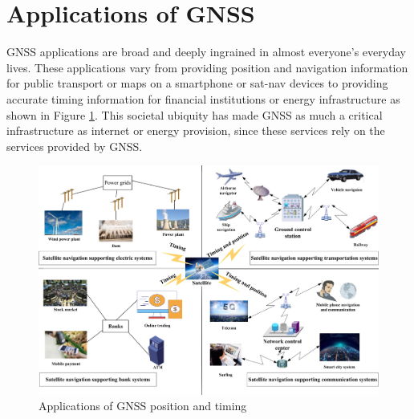 
\section{Applications of GNSS} \label{sec:ApplicationsGNSS}
GNSS applications are broad and deeply ingrained in almost everyone's everyday lives. These applications vary from providing position and navigation information for public
transport or maps on a smartphone or sat-nav devices to providing accurate timing information for financial institutions or energy infrastructure \cite{RN33} \cite{RN12}
as shown in Figure \ref{fig:GNSS Applications}. This societal ubiquity has made GNSS as much a critical infrastructure as internet or energy provision, since these
services rely on the services provided by GNSS.

\begin{figure}[h]
    \begin{centering}
        \includegraphics[width=14cm,keepaspectratio]{Figures/GNSS applications.png}
        \caption{Applications of GNSS position and timing \cite{RN33}}
        \label{fig:GNSS Applications}
    \end{centering}
\end{figure}


